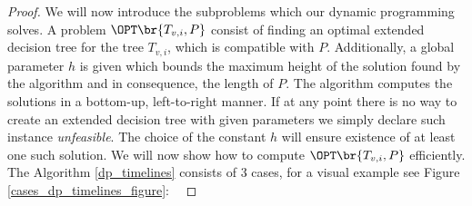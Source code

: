 \begin{theorem}
\begin{proof}
We will now introduce the subproblems which our dynamic programming solves. A problem $\OPT\br{T_{v,i}, P}$ consist of finding an optimal extended decision tree for the tree $T_{v,i}$, which is compatible with $P$. Additionally, a global parameter $h$ is given which bounds the maximum height of the solution found by the algorithm and in consequence, the length of $P$. The algorithm computes the solutions in a bottom-up, left-to-right manner. If at any point there is no way to create an extended decision tree with given parameters we simply declare such instance \textit{unfeasible}. The choice of the constant $h$ will ensure existence of at least one such solution. We will now show how to compute $\OPT\br{T_{v,i}, P}$ efficiently. The Algorithm \ref{dp_timelines} consists of 3 cases, for a visual example see Figure \ref{cases_dp_timelines_figure}:
\




\end{proof}
\end{theorem}
